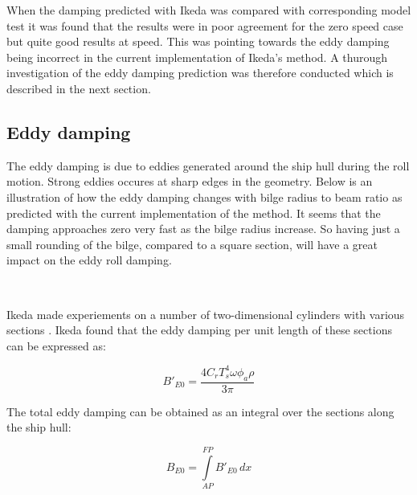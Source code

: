     When the damping predicted with Ikeda was compared with corresponding
model test it was found that the results were in poor agreement for the
zero speed case but quite good results at speed. This was pointing
towards the eddy damping being incorrect in the current implementation
of Ikeda's method. A thurough investigation of the eddy damping
prediction was therefore conducted which is described in the next
section.

    \subsection{Eddy damping}\label{eddy-damping}

The eddy damping is due to eddies generated around the ship hull during
the roll motion. Strong eddies occures at sharp edges in the geometry.
Below is an illustration of how the eddy damping changes with bilge
radius to beam ratio as predicted with the current implementation of the
method. It seems that the damping approaches zero very fast as the bilge
radius increase. So having just a small rounding of the bilge, compared
to a square section, will have a great impact on the eddy roll damping.

    \begin{center}
    \end{center}
    { \hspace*{\fill} \\}
    
    Ikeda made experiements on a number of two-dimensional cylinders with
various sections \cite{7505983/4AFVVGNT}. Ikeda found that the eddy
damping per unit length of these sections can be expressed as:
 
            
    
    \begin{equation}
B'_{E0} = \frac{4 C_{r} T_{s}^{4} \omega \phi_{a} \rho}{3 \pi}
\label{eq:equation}
\end{equation}

    

    The total eddy damping can be obtained as an integral over the sections
along the ship hull:
 
            
    
    \begin{equation}
B_{E0} = \int\limits_{AP}^{FP} B'_{E0}\, dx
\label{eq:equation}
\end{equation}

